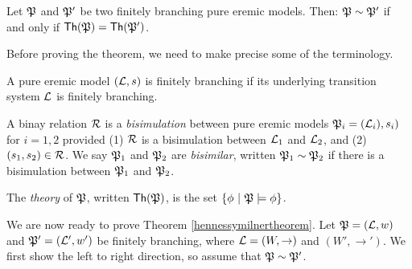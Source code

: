\begin{theorem}
\label{hennessymilnertheorem}
Let $\frak{P}$ and $\frak{P}'$ be two finitely branching pure eremic
models. Then: $\frak{P} \sim \frak{P}'$ if and only if $\mathsf{Th}(\frak{P}) =
\mathsf{Th}(\frak{P}')$.  
\end{theorem}

\NI Before proving the theorem, we need to make precise some of the
terminology.

\begin{definition}
A pure eremic model $(\mathcal{L}, s)$ is finitely branching if its
underlying transition system $\mathcal{L}$ is finitely branching.
\end{definition}

\begin{definition}
A binay relation $\mathcal{R}$ is a \emph{bisimulation} between pure eremic
models $\frak{P}_i = (\mathcal{L}_i), s_i)$ for $i = 1, 2$ provided (1) $\mathcal{R}$ is
a bisimulation between $\mathcal{L}_1$ and $\mathcal{L}_2$, and (2) $(s_1, s_2) \in
\mathcal{R}$. We say $\frak{P}_1$ and $\frak{P}_2$ are \emph{bisimilar}, written
$\frak{P}_1 \sim \frak{P}_2$ if there is a bisimulation between $\frak{P}_1$ and
$\frak{P}_2$.
\end{definition}

\begin{definition}
The \emph{theory} of $\frak{P}$, written $\mathsf{Th}(\frak{P})$, is the set
$\{\phi\ |\ \frak{P} \models \phi\}$.
\end{definition}

\NI We are now ready to prove Theorem \ref{hennessymilnertheorem}.
Let $\frak{P} = (\mathcal{L}, w)$ and $\frak{P}' = (\mathcal{L}', w')$ be finitely
branching, where $\mathcal{L} = (W, \rightarrow)$ and $(W', \rightarrow')$.
We first show the left to right direction, so assume that $\frak{P} \sim
\frak{P}'$.

